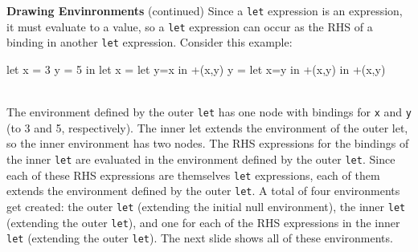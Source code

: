 \begin{minipage}[t]{\sw}
\slidenumber
\LARGE
{\bf Drawing Envinronments} (continued)\exx
Since a \verb'let' expression is an expression,
it must evaluate to a value,
so a \verb'let' expression can occur
as the RHS of a binding in another \verb'let' expression.
Consider this example:\exx
\Large
\begin{verbbox}
let %
  x = 3
  y = 5
in
  let %
    x = let y=x in +(x,y) %
    y = let x=y in +(x,y) %
  in
    +(x,y) %
\end{verbbox}
\emm\theverbbox\\
\LARGE
The environment defined by the outer \verb'let'
has one node with bindings for \verb'x' and \verb'y'
(to 3 and 5, respectively).
The inner let extends the environment of the outer let,
so the inner environment has two nodes.
The RHS expressions for the bindings of the inner \verb'let'
are evaluated in the environment defined by the outer \verb'let'.
Since each of these RHS expressions are themselves \verb'let' expressions,
each of them extends the environment defined by the outer \verb'let'.
A total of four environments get created:
the outer \verb'let' (extending the initial null environment),
the inner \verb'let' (extending the outer \verb'let'),
and one for each of the RHS expressions in the inner \verb'let'
(extending the outer \verb'let').
The next slide shows all of these environments.
\end{minipage}
